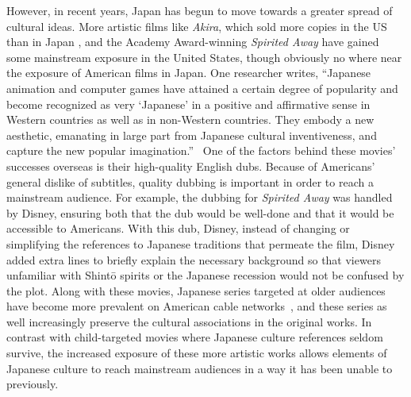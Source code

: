 \documentclass[12pt]{article}
\begin{document}
However, in recent years, Japan has begun to move towards a greater spread of cultural ideas.  More artistic films like \emph{Akira}, which sold more copies in the US than in Japan \cEncyl{\citep[pg.\ 175]}, and the Academy Award-winning \emph{Spirited Away} have gained some mainstream exposure in the United States, though obviously no where near the exposure of American films in Japan.
One researcher writes, 
``Japanese animation and computer games have attained a certain degree of popularity and become recognized as very `Japanese' in a positive and affirmative sense in Western countries as well as in non-Western countries.  They embody a new aesthetic, emanating in large part from Japanese cultural inventiveness, and capture the new popular imagination.''~\cRecentering{\citep[pg.\ 30]}  One of the factors behind these movies' successes overseas is their high-quality English dubs.  Because of Americans' general dislike of subtitles, quality dubbing is important in order to reach a mainstream audience.  For example, the dubbing for \emph{Spirited Away} was handled by Disney, ensuring both that the dub would be well-done and that it would be accessible to Americans.  With this dub, Disney, instead of changing or simplifying the references to Japanese traditions that permeate the film, Disney added extra lines to briefly explain the necessary background so that viewers unfamiliar with Shint\=o spirits or the Japanese recession would not be confused by the plot.  Along with these movies, Japanese series targeted at older audiences have become more prevalent on American cable networks~\cCool{\citep[pg.\ 46]}, and these series as well increasingly preserve the cultural associations in the original works.  In contrast with child-targeted movies where Japanese culture references seldom survive, the increased exposure of these more artistic works allows elements of Japanese culture to reach mainstream audiences in a way it has been unable to previously.
\end{document}
